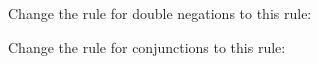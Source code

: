 \begin{earg}
\item Change the rule for double negations to this rule:

\item Change the rule for conjunctions to this rule:

\end{earg}



